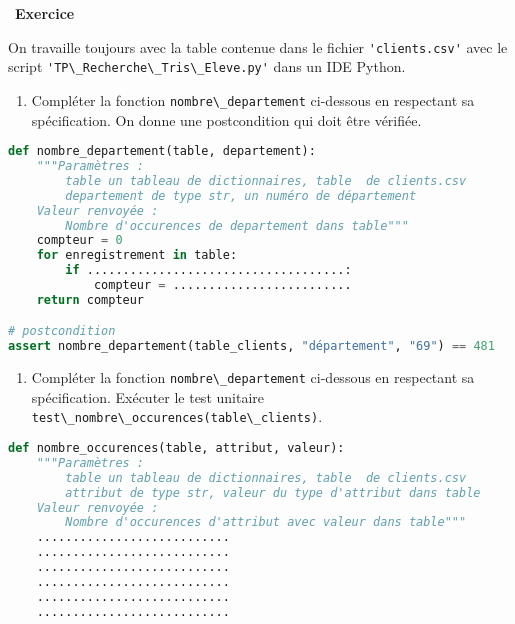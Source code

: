 \documentclass[
  11pt,
]{article}
\newcommand{\passthrough}[1]{#1}
\providecommand{\tightlist}{%
  \setlength{\itemsep}{0pt}\setlength{\parskip}{0pt}}
\newcounter{exo}
\newenvironment{exercice}[1]
{\par \medskip   \addtocounter{exo}{1} \noindent  
\begin{bclogo}[arrondi =0.1,   noborder = true, logo=\bccrayon, marge=4]{~\textbf{Exercice} \textbf{\theexo} {\itshape #1} }  \par}
{
\end{bclogo}
 \par \bigskip }
\newcounter{def}
\begin{document}
\begin{exercice}{}

On travaille toujours avec la table contenue dans le fichier
\passthrough{\lstinline!'clients.csv'!} avec le script
\passthrough{\lstinline!'TP\_Recherche\_Tris\_Eleve.py'!} dans un IDE
Python.

\begin{enumerate}
\def\labelenumi{\arabic{enumi}.}
\tightlist
\item
  Compléter la fonction \passthrough{\lstinline!nombre\_departement!}
  ci-dessous en respectant sa spécification. On donne une postcondition
  qui doit être vérifiée.
\end{enumerate}

\begin{lstlisting}[language=Python]
def nombre_departement(table, departement):
    """Paramètres : 
        table un tableau de dictionnaires, table  de clients.csv
        departement de type str, un numéro de département
    Valeur renvoyée :
        Nombre d'occurences de departement dans table"""
    compteur = 0
    for enregistrement in table:
        if ....................................:
            compteur = .........................
    return compteur

# postcondition
assert nombre_departement(table_clients, "département", "69") == 481
\end{lstlisting}

\begin{enumerate}
\def\labelenumi{\arabic{enumi}.}
\setcounter{enumi}{1}
\tightlist
\item
  Compléter la fonction \passthrough{\lstinline!nombre\_departement!}
  ci-dessous en respectant sa spécification. Exécuter le test unitaire
  \passthrough{\lstinline!test\_nombre\_occurences(table\_clients)!}.
\end{enumerate}

\begin{lstlisting}[language=Python]
def nombre_occurences(table, attribut, valeur):
    """Paramètres : 
        table un tableau de dictionnaires, table  de clients.csv
        attribut de type str, valeur du type d'attribut dans table
    Valeur renvoyée :
        Nombre d'occurences d'attribut avec valeur dans table"""
    ...........................
    ...........................
    ...........................
    ...........................
    ...........................
    ...........................
\end{lstlisting}


\end{exercice}
\end{document}
